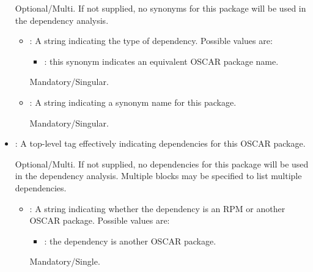 \begin{itemize}
  Optional/Multi.  If not supplied, no synonyms for this package
  will be used in the dependency analysis.

  \begin{itemize}
  \item {}: A string indicating the type of dependency.
    Possible values are:

    \begin{itemize}
    \item {}: this synonym indicates an equivalent OSCAR
      package name.
    \end{itemize}

    Mandatory/Singular.
  \item {}: A string indicating a synonym name for this
    package.

    Mandatory/Singular.
  \end{itemize}

\item {}: A top-level tag effectively indicating
  dependencies for this OSCAR package.  
  
  Optional/Multi.  If not supplied, no dependencies for this package
  will be used in the dependency analysis.  Multiple 
  blocks may be specified to list multiple dependencies.

  \begin{itemize}
  \item {}: A string indicating whether the dependency is
    an RPM or another OSCAR package.  Possible values are:

    \begin{itemize}
    \item {}: the dependency is another OSCAR package.
    \end{itemize}

    Mandatory/Single.
    

    

\end{itemize}
\end{itemize}
